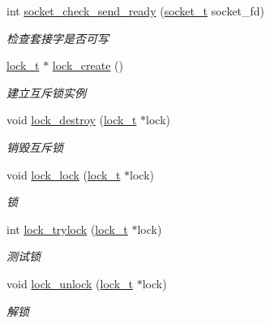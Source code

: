 \begin{DoxyCompactItemize}
int \hyperlink{a00063_a8afd26cc26824e35f1ec942d2c367c2b_a8afd26cc26824e35f1ec942d2c367c2b}{socket\+\_\+check\+\_\+send\+\_\+ready} (\hyperlink{a00044_a0d9e0afbf02fb6ed6c5b1415dce51b05_a0d9e0afbf02fb6ed6c5b1415dce51b05}{socket\+\_\+t} socket\+\_\+fd)
\begin{DoxyCompactList}\small\item\em 检查套接字是否可写 \end{DoxyCompactList}\item 
\hyperlink{a00044_ad3e00e0eb0c79dfd77ff2ff833f49c7d_ad3e00e0eb0c79dfd77ff2ff833f49c7d}{lock\+\_\+t} $\ast$ \hyperlink{a00063_a0e47279c8c752d22446932673be52e38_a0e47279c8c752d22446932673be52e38}{lock\+\_\+create} ()
\begin{DoxyCompactList}\small\item\em 建立互斥锁实例 \end{DoxyCompactList}\item 
void \hyperlink{a00063_aba61c8c4b8ee5ec7e337ed950d680702_aba61c8c4b8ee5ec7e337ed950d680702}{lock\+\_\+destroy} (\hyperlink{a00044_ad3e00e0eb0c79dfd77ff2ff833f49c7d_ad3e00e0eb0c79dfd77ff2ff833f49c7d}{lock\+\_\+t} $\ast$lock)
\begin{DoxyCompactList}\small\item\em 销毁互斥锁 \end{DoxyCompactList}\item 
void \hyperlink{a00063_ad8e04f3d702d3f15868c064947d396b3_ad8e04f3d702d3f15868c064947d396b3}{lock\+\_\+lock} (\hyperlink{a00044_ad3e00e0eb0c79dfd77ff2ff833f49c7d_ad3e00e0eb0c79dfd77ff2ff833f49c7d}{lock\+\_\+t} $\ast$lock)
\begin{DoxyCompactList}\small\item\em 锁 \end{DoxyCompactList}\item 
int \hyperlink{a00063_a2caa15f5d1698c623c1861bd02184d0e_a2caa15f5d1698c623c1861bd02184d0e}{lock\+\_\+trylock} (\hyperlink{a00044_ad3e00e0eb0c79dfd77ff2ff833f49c7d_ad3e00e0eb0c79dfd77ff2ff833f49c7d}{lock\+\_\+t} $\ast$lock)
\begin{DoxyCompactList}\small\item\em 测试锁 \end{DoxyCompactList}\item 
void \hyperlink{a00063_a99cf1d42527f5715b798064281e918ed_a99cf1d42527f5715b798064281e918ed}{lock\+\_\+unlock} (\hyperlink{a00044_ad3e00e0eb0c79dfd77ff2ff833f49c7d_ad3e00e0eb0c79dfd77ff2ff833f49c7d}{lock\+\_\+t} $\ast$lock)
\begin{DoxyCompactList}\small\item\em 解锁 \end{DoxyCompactList}\item 

\end{DoxyCompactItemize}
